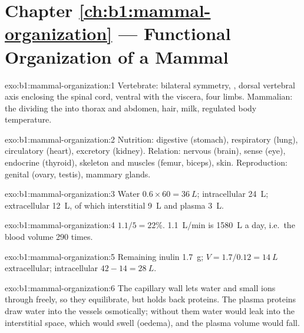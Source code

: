 \section*{Chapter \ref{ch:b1:mammal-organization} --- Functional Organization of a Mammal}

\begin{solution}{exo:b1:mammal-organization:1}
Vertebrate: bilateral symmetry, , dorsal vertebral axis
enclosing the spinal cord, ventral  with the viscera, four limbs.
Mammalian: the  dividing the  into thorax and abdomen,
hair, milk, regulated body temperature.
\end{solution}

\begin{solution}{exo:b1:mammal-organization:2}
Nutrition: digestive (stomach), respiratory (lung), circulatory
(heart), excretory (kidney). Relation: nervous (brain), sense 
(eye), endocrine (thyroid), skeleton and muscles (femur, biceps), skin.
Reproduction: genital (ovary, testis), mammary glands.
\end{solution}

\begin{solution}{exo:b1:mammal-organization:3}
Water $0.6\times 60 = \qty{36}{L}$; intracellular \qty{24}{L};
extracellular \qty{12}{L}, of which interstitial \qty{9}{L} and plasma
\qty{3}{L}.
\end{solution}

\begin{solution}{exo:b1:mammal-organization:4}
$1.1/5 = 22\%$. \qty{1.1}{L/min} is \qty{1580}{L} a day, i.e.\ the
blood volume 290 times.
\end{solution}

\begin{solution}{exo:b1:mammal-organization:5}
Remaining inulin \qty{1.7}{g}; $V = 1.7/0.12 = \qty{14}{L}$
extracellular; intracellular $42 - 14 = \qty{28}{L}$.
\end{solution}

\begin{solution}{exo:b1:mammal-organization:6}
The capillary wall lets water and small ions through freely, so they
equilibrate, but holds back proteins. The plasma proteins draw water
into the vessels osmotically; without them water would leak into the
interstitial space, which would swell (oedema), and the plasma volume
would fall.
\end{solution}


